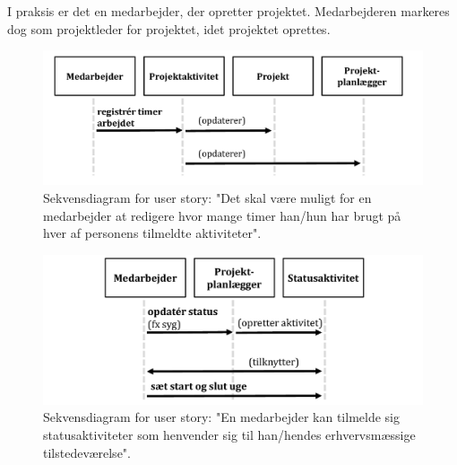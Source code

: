 I praksis er det en medarbejder, der opretter projektet. Medarbejderen markeres dog som projektleder for projektet, idet projektet oprettes.

\begin{figure}[H]
    \centering
    \includegraphics[width=\textwidth]{Figurer/seq3_regtimer.pdf}
    \caption{Sekvensdiagram for user story: "Det skal være muligt for en medarbejder at redigere hvor mange timer han/hun har brugt på hver af personens tilmeldte aktiviteter".}
    \label{fig:seq3_regtimer}
\end{figure}

\begin{figure}[H]
    \centering
    \includegraphics[width=\textwidth]{Figurer/seq4_status.pdf}
    \caption{Sekvensdiagram for user story: "En medarbejder kan tilmelde sig statusaktiviteter som henvender sig til han/hendes erhvervsmæssige  tilstedeværelse".}
    \label{fig:seq4_status}
\end{figure}
